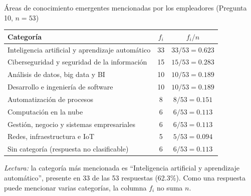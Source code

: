 \begin{mitabla}{Áreas de conocimiento emergentes mencionadas por los empleadores (Pregunta 10, $n=53$)}
\begin{tabular}{L{9cm}cc}
\toprule
Categoría & $f_i$ & $f_i/n$ \\
\midrule
Inteligencia artificial y aprendizaje automático & 33 & $33/53 = 0.623$ \\
Ciberseguridad y seguridad de la información & 15 & $15/53 = 0.283$ \\
Análisis de datos, big data y BI & 10 & $10/53 = 0.189$ \\
Desarrollo e ingeniería de software & 10 & $10/53 = 0.189$ \\
Automatización de procesos & 8 & $8/53 = 0.151$ \\
Computación en la nube & 6 & $6/53 = 0.113$ \\
Gestión, negocio y sistemas empresariales & 6 & $6/53 = 0.113$ \\
Redes, infraestructura e IoT & 5 & $5/53 = 0.094$ \\
\midrule
Sin categoría (respuesta no clasificable) & 6 & $6/53 = 0.113$ \\
\bottomrule
\end{tabular}
\end{mitabla}

\textit{Lectura:} la categoría más mencionada es ``Inteligencia artificial y aprendizaje automático'', presente en 33 de las 53 respuestas (62.3\%). Como una respuesta puede mencionar varias categorías, la columna $f_i$ no suma $n$.

